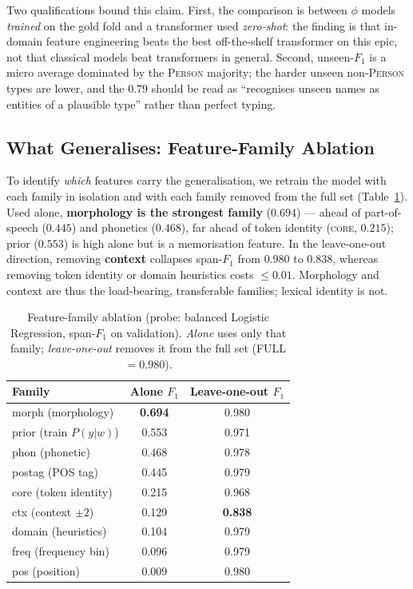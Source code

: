 \documentclass[conference]{IEEEtran}
\begin{document}
Two qualifications bound this claim. First, the comparison is between $\phi$ models \emph{trained} on the gold fold and a transformer used \emph{zero-shot}: the finding is that in-domain feature engineering beats the best off-the-shelf transformer on this epic, not that classical models beat transformers in general. Second, unseen-$F_1$ is a micro average dominated by the \textsc{Person} majority; the harder unseen non-\textsc{Person} types are lower, and the $0.79$ should be read as ``recognises unseen names as entities of a plausible type'' rather than perfect typing.

\subsection{What Generalises: Feature-Family Ablation}
\label{sec:ablation}

To identify \emph{which} features carry the generalisation, we retrain the model with each family in isolation and with each family removed from the full set (Table~\ref{tab:ablation}). Used alone, \textbf{morphology is the strongest family} ($0.694$) --- ahead of part-of-speech ($0.445$) and phonetics ($0.468$), far ahead of token identity (\textsc{core}, $0.215$); prior ($0.553$) is high alone but is a memorisation feature. In the leave-one-out direction, removing \textbf{context} collapses span-$F_1$ from $0.980$ to $0.838$, whereas removing token identity or domain heuristics costs $\le 0.01$. Morphology and context are thus the load-bearing, transferable families; lexical identity is not.

\begin{table}[!t]
\centering
\caption{Feature-family ablation (probe: balanced Logistic Regression, span-$F_1$ on validation). \emph{Alone} uses only that family; \emph{leave-one-out} removes it from the full set (FULL $=0.980$).}
\label{tab:ablation}
\small
\begin{tabular}{@{}l c c@{}}
\toprule
\textbf{Family} & \textbf{Alone} $F_1$ & \textbf{Leave-one-out} $F_1$ \\
\midrule
morph (morphology)      & \textbf{0.694} & 0.980 \\
prior (train $P(y|w)$)  & 0.553 & 0.971 \\
phon (phonetic)         & 0.468 & 0.978 \\
postag (POS tag)        & 0.445 & 0.979 \\
core (token identity)   & 0.215 & 0.968 \\
ctx (context $\pm2$)    & 0.129 & \textbf{0.838} \\
domain (heuristics)     & 0.104 & 0.979 \\
freq (frequency bin)    & 0.096 & 0.979 \\
pos (position)          & 0.009 & 0.980 \\
\bottomrule
\end{tabular}
\end{table}
\end{document}
